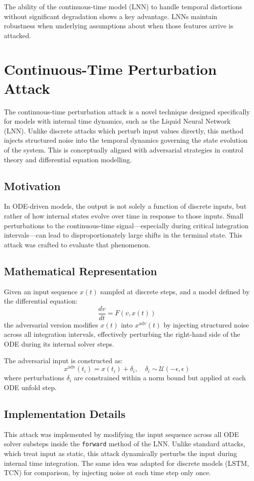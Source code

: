 The ability of the continuous-time model (LNN) to handle temporal distortions without significant degradation shows a key advantage. LNNs maintain robustness when underlying assumptions about when those features arrive is attacked.

\section{Continuous-Time Perturbation Attack}

The continuous-time perturbation attack is a novel technique designed specifically for models with internal time dynamics, such as the Liquid Neural Network (LNN). Unlike discrete attacks which perturb input values directly, this method injects structured noise into the temporal dynamics governing the state evolution of the system. This is conceptually aligned with adversarial strategies in control theory and differential equation modelling.

\subsection*{Motivation}
In ODE-driven models, the output is not solely a function of discrete inputs, but rather of how internal states evolve over time in response to those inputs. Small perturbations to the continuous-time signal—especially during critical integration intervals—can lead to disproportionately large shifts in the terminal state. This attack was crafted to evaluate that phenomenon.

\subsection*{Mathematical Representation}
Given an input sequence $x(t)$ sampled at discrete steps, and a model defined by the differential equation:
\[
\frac{dv}{dt} = F(v, x(t))
\]
the adversarial version modifies $x(t)$ into $x^{\text{adv}}(t)$ by injecting structured noise across all integration intervals, effectively perturbing the right-hand side of the ODE during its internal solver steps.

The adversarial input is constructed as:
\[
x^{\text{adv}}(t_i) = x(t_i) + \delta_i, \quad \delta_i \sim \mathcal{U}(-\epsilon, \epsilon)
\]
where perturbations $\delta_i$ are constrained within a norm bound but applied at each ODE unfold step.

\subsection*{Implementation Details}
This attack was implemented by modifying the input sequence across all ODE solver substeps inside the \texttt{forward} method of the LNN. Unlike standard attacks, which treat input as static, this attack dynamically perturbs the input during internal time integration. The same idea was adapted for discrete models (LSTM, TCN) for comparison, by injecting noise at each time step only once.

